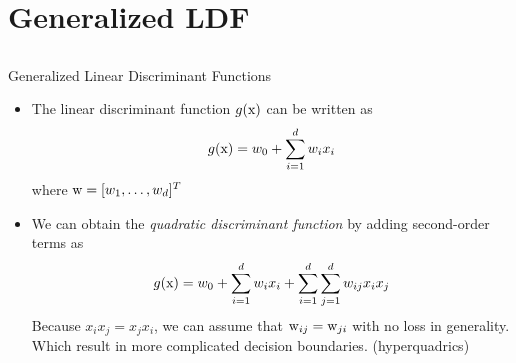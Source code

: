 
\section{Generalized LDF}
\subsection{}
\begin{frame}{Generalized Linear Discriminant Functions}
\begin{itemize}
\item The linear discriminant function $g({\rm x})$ can be written as
\begin{equation}
g({\rm x}) = w_0+\sum_{i=1}^d w_ix_i
\end{equation}
where ${\rm w}=[w_1,\ldots,w_d]^T$
\item We can obtain the \textit{\color{mycolor2}quadratic discriminant function} by adding second-order terms as
\begin{equation}
g({\rm x}) = w_0+\sum_{i=1}^d w_ix_i+\sum_{i=1}^d\sum_{j=1}^dw_{ij}x_ix_j
\end{equation}
Because $x_ix_j=x_jx_i$, we can assume that ${\rm w}_{ij}={\rm w}_{ji}$  with no loss in generality. Which result in more complicated decision boundaries.
({\color{mycolor2}hyperquadrics})
\end{itemize}
\end{frame}

